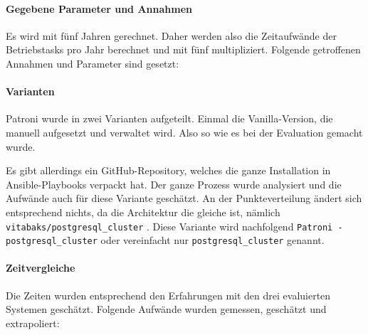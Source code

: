 
\clearpage
\begin{flushleft}
    \paragraph{Gegebene Parameter und Annahmen}
    Es wird mit fünf Jahren gerechnet.
    Daher werden also die Zeitaufwände der Betriebstasks pro Jahr berechnet und mit fünf multipliziert.
    Folgende getroffenen Annahmen und Parameter sind gesetzt:
    
    \paragraph{Varianten}
    Patroni wurde in zwei Varianten aufgeteilt.
    Einmal die Vanilla-Version, die manuell aufgesetzt und verwaltet wird.
    Also so wie es bei der Evaluation gemacht wurde.
\end{flushleft}
\begin{flushleft}
    Es gibt allerdings ein \Gls{GitHub}-Repository, welches die ganze Installation in \Gls{Ansible}-Playbooks verpackt hat.
    Der ganze Prozess wurde analysiert und die Aufwände auch für diese Variante geschätzt.
    An der Punkteverteilung ändert sich entsprechend nichts, da die Architektur die gleiche ist, nämlich \texttt{vitabaks/postgresql\_cluster} \cite{HIQVBEPF}.
    Diese Variante wird nachfolgend \texttt{Patroni - postgresql\_cluster} oder vereinfacht nur \texttt{postgresql\_cluster} genannt.
\end{flushleft}
\clearpage
\begin{flushleft}
    \paragraph{Zeitvergleiche}
    Die Zeiten wurden entsprechend den Erfahrungen mit den drei evaluierten Systemen geschätzt.
    Folgende Aufwände wurden gemessen, geschätzt und extrapoliert:
    
\end{flushleft}
